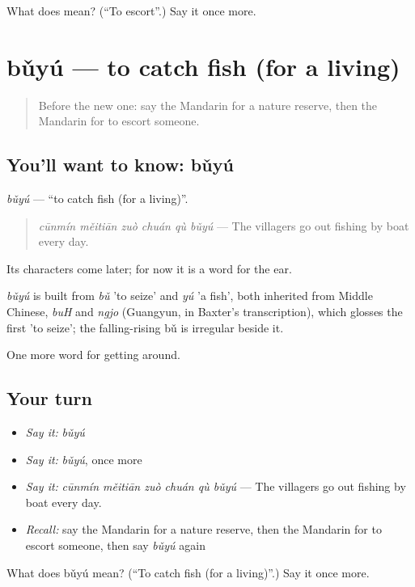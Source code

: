 \begin{tcolorbox}[breakable,colback=teal!4,colframe=teal!35!black,title={Before you move on}]
What does  mean? (\textquotedblleft{}To escort\textquotedblright{}.) Say it once more.
\end{tcolorbox}
\section[bǔyú]{bǔyú — to catch fish (for a living)}

\label{lesson:ZH-C443-buyu}



\begin{quote}
Before the new one: say the Mandarin for a nature reserve, then the Mandarin for to escort someone.
\end{quote}

\subsection*{You'll want to know: bǔyú}
\emph{bǔyú} — \textquotedblleft{}to catch fish (for a living)\textquotedblright{}.

\begin{quote}
\emph{cūnmín měitiān zuò chuán qù bǔyú} — The villagers go out fishing by boat every day.
\end{quote}

Its characters come later; for now it is a word for the ear.

\begin{cousinweb}
\emph{bǔyú} is built from \emph{bǔ} 'to seize' and \emph{yú} 'a fish', both inherited from Middle Chinese, \emph{buH} and \emph{ngjo} (Guangyun, in Baxter's transcription), which glosses the first 'to seize'; the falling-rising bǔ is irregular beside it.
\end{cousinweb}

\begin{grammarlens}[title={What you've built}]
One more word for getting around.
\end{grammarlens}

\subsection*{Your turn}
\begin{itemize}
\raggedright
  \item \emph{Say it:} \emph{bǔyú}
  \item \emph{Say it:} \emph{bǔyú}, once more
  \item \emph{Say it:} \emph{cūnmín měitiān zuò chuán qù bǔyú} — The villagers go out fishing by boat every day.
  \item \emph{Recall:} say the Mandarin for a nature reserve, then the Mandarin for to escort someone, then say \emph{bǔyú} again
\end{itemize}

\begin{tcolorbox}[breakable,colback=teal!4,colframe=teal!35!black,title={Before you move on}]
What does bǔyú mean? (\textquotedblleft{}To catch fish (for a living)\textquotedblright{}.) Say it once more.
\end{tcolorbox}
